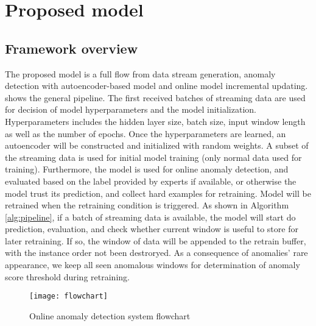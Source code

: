 \chapter{Proposed model}
\label{chap:Proposedmodel}

\section{Framework overview}
\label{sec:framework}

The proposed model is a full flow from data stream generation, anomaly detection with autoencoder-based model and online model incremental updating.  shows the general pipeline. The first received batches of streaming data are used for decision of model hyperparameters and the model initialization. Hyperparameters includes the hidden layer size, batch size, input window length as well as the number of epochs. Once the hyperparameters are learned, an autoencoder will be constructed and initialized with random weights. A subset of the streaming data is used for initial model training (only normal data used for training). Furthermore, the model is used for online anomaly detection, and evaluated based on the label provided by experts if available, or otherwise the model trust its prediction, and collect hard examples for retraining. Model will be retrained when the retraining condition is triggered. As shown in Algorithm \ref{alg:pipeline}, if a batch of streaming data is available, the model will start do prediction, evaluation, and check whether current window is useful to store for later retraining. If so, the window of data will be appended to the retrain buffer, with the instance order not been destroryed. As a consequence of anomalies' rare appearance, we keep all seen anomalous windows for determination of anomaly score threshold during retraining. 


\begin{figure}[h]
\centering
\texttt{[image: flowchart]}
\caption[Online anomaly detection system flowchart]{Online anomaly detection system flowchart}
\label{fig:flowchart}
\end{figure}

